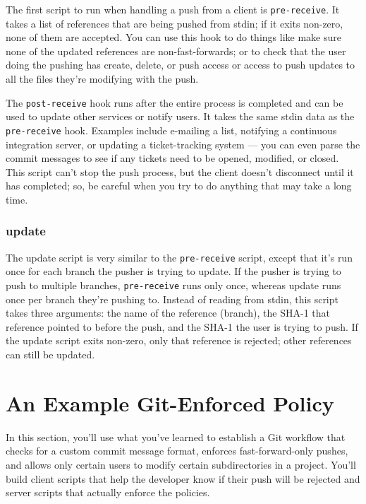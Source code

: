 \documentclass[a4paper]{book}
\newcounter{tab}[chapter]
\begin{document}
The first script to run when handling a push from a client is \texttt{pre-receive}. It takes a list of references that are being pushed from stdin; if it exits non-zero, none of them are accepted. You can use this hook to do things like make sure none of the updated references are non-fast-forwards; or to check that the user doing the pushing has create, delete, or push access or access to push updates to all the files they're modifying with the push.

The \texttt{post-receive} hook runs after the entire process is completed and can be used to update other services or notify users. It takes the same stdin data as the \texttt{pre-receive} hook. Examples include e-mailing a list, notifying a continuous integration server, or updating a ticket-tracking system --- you can even parse the commit messages to see if any tickets need to be opened, modified, or closed. This script can't stop the push process, but the client doesn't disconnect until it has completed; so, be careful when you try to do anything that may take a long time.

\subsubsection{update}

The update script is very similar to the \texttt{pre-receive} script, except that it's run once for each branch the pusher is trying to update. If the pusher is trying to push to multiple branches, \texttt{pre-receive} runs only once, whereas update runs once per branch they're pushing to. Instead of reading from stdin, this script takes three arguments: the name of the reference (branch), the SHA-1 that reference pointed to before the push, and the SHA-1 the user is trying to push. If the update script exits non-zero, only that reference is rejected; other references can still be updated.

\section{An Example Git-Enforced Policy}

In this section, you'll use what you've learned to establish a Git workflow that checks for a custom commit message format, enforces fast-forward-only pushes, and allows only certain users to modify certain subdirectories in a project. You'll build client scripts that help the developer know if their push will be rejected and server scripts that actually enforce the policies.
\end{document}
